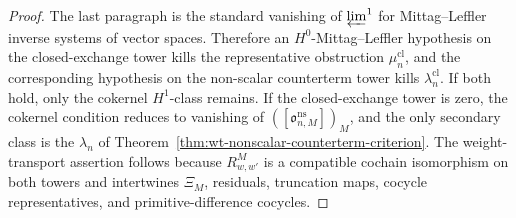 \begin{proof}
  The last paragraph is the standard vanishing of
  \(\varprojlim^1\) for Mittag--Leffler inverse systems of vector spaces.
  Therefore an \(H^0\)-Mittag--Leffler hypothesis on the closed-exchange
  tower kills the representative obstruction \(\mu^{\mathrm{cl}}_n\), and
  the corresponding hypothesis on the non-scalar counterterm tower kills
  \(\lambda^{\mathrm{cl}}_n\).  If both hold, only the cokernel
  \(H^1\)-class remains.  If the closed-exchange tower is zero, the
  cokernel condition reduces to vanishing of
  \(([\mathfrak o^{\mathrm{ns}}_{n,M}])_M\), and the only secondary class
  is the \(\lambda_n\) of
  Theorem~\ref{thm:wt-nonscalar-counterterm-criterion}.
  The weight-transport assertion follows because \(R^M_{w,w'}\) is a
  compatible cochain isomorphism on both towers and intertwines
  \(\Xi_M\), residuals, truncation maps, cocycle representatives, and
  primitive-difference cocycles.
\end{proof}

